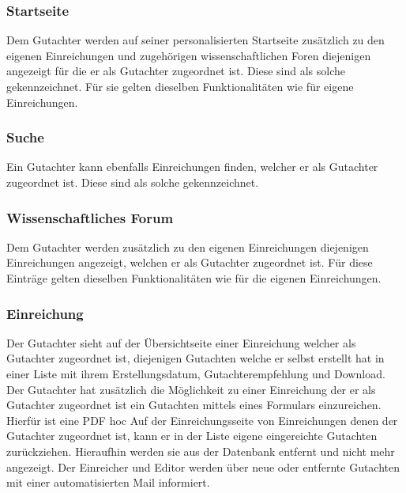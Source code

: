 \subsubsection{Startseite}
\begin{description}
     Dem Gutachter werden auf seiner personalisierten Startseite zusätzlich zu den eigenen
    Einreichungen und zugehörigen wissenschaftlichen Foren diejenigen angezeigt für die er als Gutachter
    zugeordnet ist. Diese sind als solche gekennzeichnet.
    Für sie gelten dieselben Funktionalitäten wie für eigene Einreichungen. %
\end{description}

\subsubsection{Suche}
\begin{description}
     Ein Gutachter kann ebenfalls Einreichungen finden, welcher er als Gutachter
    zugeordnet ist. Diese sind als solche gekennzeichnet.
\end{description}

\subsubsection{Wissenschaftliches Forum}
\begin{description}
     Dem Gutachter werden zusätzlich zu den eigenen Einreichungen diejenigen Einreichungen angezeigt,
    welchen er als Gutachter zugeordnet ist. Für diese Einträge gelten dieselben Funktionalitäten wie für die
    eigenen Einreichungen. %
\end{description}

\subsubsection{Einreichung}
\begin{description}
     Der Gutachter sieht auf der Übersichtseite einer Einreichung welcher als Gutachter
    zugeordnet ist, diejenigen Gutachten welche er selbst erstellt hat in einer
    Liste mit ihrem Erstellungsdatum, Gutachterempfehlung und Download.
     Der Gutachter hat zusätzlich die Möglichkeit zu einer Einreichung der er als Gutachter zugeordnet ist
    ein Gutachten mittels eines Formulars einzureichen. Hierfür ist eine PDF hoc
     Auf der Einreichungsseite von Einreichungen denen der Gutachter zugeordnet ist,
    kann er in der Liste eigene eingereichte Gutachten zurückziehen. Hieraufhin werden sie aus
    der Datenbank entfernt und nicht mehr angezeigt.
     Der Einreicher und Editor werden über neue oder entfernte Gutachten mit einer automatisierten
    Mail informiert.
\end{description}

